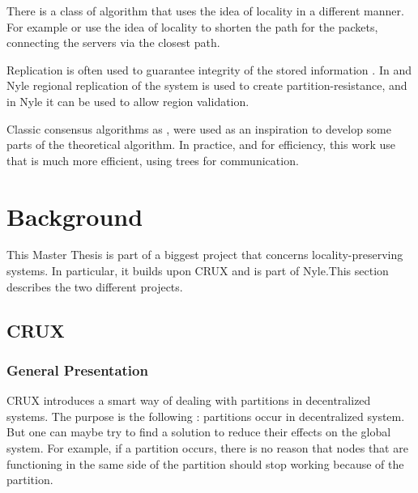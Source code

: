 \documentclass[a4paper,11pt,oneside]{report}
\begin{document}
There is a class of algorithm that uses the idea of locality in a different
manner. For example \cite{Geo-DNS} or \cite{IP Anycast} use the idea of
locality to shorten the path for the packets, connecting the servers via the
closest path.

Replication is often used to guarantee integrity of the stored information
\cite{find-paper-replication}. In \cite{CRUX} and Nyle regional replication of
the system is used to create partition-resistance, and in Nyle it can be used to allow region validation.

Classic consensus algorithms as \cite{Paxos}, \cite{PBFT} were used as an
inspiration to develop some parts of the theoretical algorithm. In practice,
and for efficiency, this work use \cite{BlsCoSi} that is much more efficient,
using trees for communication.  




\chapter{Background}


This Master Thesis is part of a biggest project that concerns
locality-preserving systems. In particular, it builds upon CRUX\cite{basescu2014crux} and is part of Nyle.This section describes
the two different projects. 

\section{CRUX}

\subsection{General Presentation} CRUX introduces a smart way of dealing with
partitions in decentralized systems. The purpose is the following : partitions
occur in decentralized system. But one can maybe try to find a solution to
reduce their effects on the global system. For example, if a partition occurs,
there is no reason that nodes that are functioning in the same side of the
partition should stop working because of the partition. 
\end{document}
